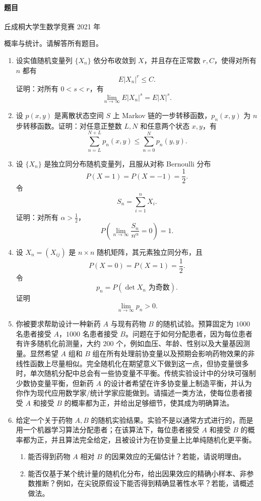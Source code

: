 \documentclass[UTF8,12pt]{ctexart}
\begin{document}
\paragraph{题目}
丘成桐大学生数学竞赛 2021 年

概率与统计。请解答所有题目。

\begin{enumerate}[label=\textbf{\arabic*.},leftmargin=2.2em]
\item 设实值随机变量列 \(\{X_n\}\) 依分布收敛到 \(X\)，并且存在正常数 \(r,C\)，使得对所有 \(n\) 都有
\[
E|X_n|^r\le C.
\]
证明：对所有 \(0<s<r\)，有
\[
\lim_{n\to\infty}E|X_n|^s=E|X|^s.
\]

\item 设 \(p(x,y)\) 是离散状态空间 \(S\) 上 Markov 链的一步转移函数，\(p_n(x,y)\) 为 \(n\) 步转移函数。证明：对任意正整数 \(L,N\) 和任意两个状态 \(x,y\)，有
\[
\sum_{n=L}^{N+L}p_n(x,y)\le \sum_{n=0}^{N}p_n(y,y).
\]

\item 设 \(\{X_n\}\) 是独立同分布随机变量列，且服从对称 Bernoulli 分布
\[
P(X=1)=P(X=-1)=\frac12.
\]
令
\[
S_n=\sum_{i=1}^n X_i.
\]
证明：对所有 \(\alpha>\frac12\)，
\[
P\left(\lim_{n\to\infty}\frac{S_n}{n^\alpha}=0\right)=1.
\]

\item 设 \(X_n=(X_{ij})\) 是 \(n\times n\) 随机矩阵，其元素独立同分布，且
\[
P(X=0)=P(X=1)=\frac12.
\]
令
\[
p_n=P(\det X_n\text{ 为奇数}).
\]
证明
\[
\lim_{n\to\infty}p_n>0.
\]

\item 你被要求帮助设计一种新药 \(A\) 与现有药物 \(B\) 的随机试验。预算固定为 \(1000\) 名患者接受 \(A\)，\(1000\) 名患者接受 \(B\)。问题在于如何分配患者，因为每位患者有许多随机化前测量，大约 \(200\) 个，例如血压、年龄、性别以及大量基因测量。显然希望 \(A\) 组和 \(B\) 组在所有处理前协变量以及预期会影响药物效果的非线性函数上尽量相似。完全随机化在期望意义下做到这一点，但协变量很多时，单次随机分配中总会有一些协变量不平衡。传统实验设计中的分块可强制少数协变量平衡，但新药 \(A\) 的设计者希望在许多协变量上制造平衡，并认为你作为现代应用数学家/统计学家应能做到。请描述一类方法，使每位患者接受 \(A\) 和接受 \(B\) 的概率都为正，并给出足够细节，使其成为明确算法。

\item 给定一个关于药物 \(A,B\) 的随机实验结果。实验不是以通常方式进行的，而是用一个机器学习算法分配患者；在该算法下，每位患者接受 \(A\) 和接受 \(B\) 的概率都为正，并且算法完全给定，且被设计为在协变量上比单纯随机化更平衡。
\begin{enumerate}[label=\textbf{(\alph*)},leftmargin=2.4em]
\item 能否得到药物 \(A\) 相对 \(B\) 的因果效应的无偏估计？若能，请说明理由。
\item 能否仅基于某个统计量的随机化分布，给出因果效应的精确小样本、非参数推断？例如，在尖锐原假设下能否得到精确显著性水平？若能，请概述做法。
\end{enumerate}
\end{enumerate}
\end{document}
